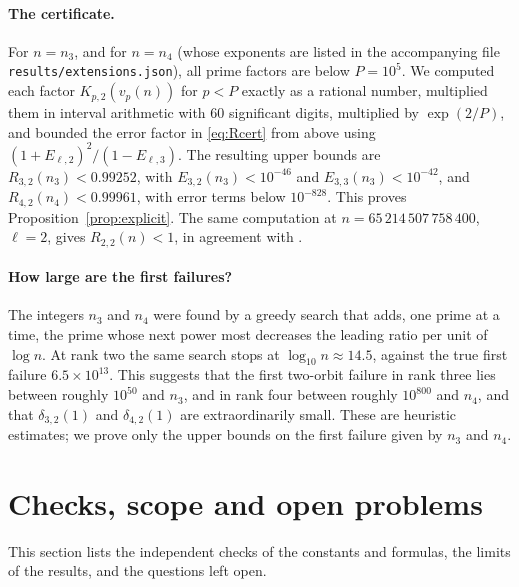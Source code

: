 \documentclass[11pt,a4paper]{article}
\theoremstyle{remark}
\numberwithin{equation}{section}
\begin{document}
\paragraph{The certificate.} For $n=n_3$, and for $n=n_4$ (whose exponents are listed in the accompanying file \texttt{results/extensions.json}), all prime factors are below $P=10^5$. We computed each factor $K_{p,2}(v_p(n))$ for $p<P$ exactly as a rational number, multiplied them in interval arithmetic with $60$ significant digits, multiplied by $\exp(2/P)$, and bounded the error factor in \eqref{eq:Rcert} from above using $(1+E_{\ell,2})^2/(1-E_{\ell,3})$. The resulting upper bounds are $R_{3,2}(n_3)<0.99252$, with $E_{3,2}(n_3)<10^{-46}$ and $E_{3,3}(n_3)<10^{-42}$, and $R_{4,2}(n_4)<0.99961$, with error terms below $10^{-828}$.
This proves Proposition~\ref{prop:explicit}. The same computation at $n=65\,214\,507\,758\,400$, $\ell=2$, gives $R_{2,2}(n)<1$, in agreement with \cite{CHS2026}.

\paragraph{How large are the first failures?} The integers $n_3$ and $n_4$ were found by a greedy search that adds, one prime at a time, the prime whose next power most decreases the leading ratio per unit of $\log n$. At rank two the same search stops at $\log_{10}n\approx14.5$, against the true first failure $6.5\times10^{13}$. This suggests that the first two-orbit failure in rank three lies between roughly $10^{50}$ and $n_3$, and in rank four between roughly $10^{800}$ and $n_4$, and that $\delta_{3,2}(1)$ and $\delta_{4,2}(1)$ are extraordinarily small. These are heuristic estimates; we prove only the upper bounds on the first failure given by $n_3$ and $n_4$.

\section{Checks, scope and open problems}\label{sec:checks}

This section lists the independent checks of the constants and formulas, the limits of the results, and the questions left open.
\end{document}

